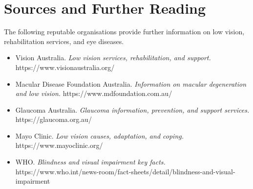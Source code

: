 \section*{Sources and Further Reading}
The following reputable organisations provide further information on low vision, rehabilitation services, and eye diseases.
\begin{itemize}
    \item Vision Australia. \textit{Low vision services, rehabilitation, and support.} https://www.visionaustralia.org/
    \item Macular Disease Foundation Australia. \textit{Information on macular degeneration and low vision.} https://www.mdfoundation.com.au/
    \item Glaucoma Australia. \textit{Glaucoma information, prevention, and support services.} https://glaucoma.org.au/
    \item Mayo Clinic. \textit{Low vision causes, adaptation, and coping.} https://www.mayoclinic.org/
    \item WHO. \textit{Blindness and visual impairment key facts.} https://www.who.int/news-room/fact-sheets/detail/blindness-and-visual-impairment
\end{itemize}
